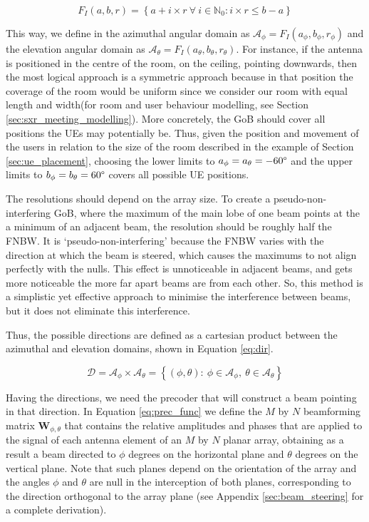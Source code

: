 \begin{equation} \label{eq:inter_func}
    F_I(a, b, r) = \left\{a + i \times r \  \forall \ i \in \mathbb{N}_0: i \times r \leq b-a \right\}
\end{equation}

This way, we define in the azimuthal angular domain as $\mathcal{A}_\phi = F_I(a_\phi, b_\phi, r_\phi)$ and the elevation angular domain as $\mathcal{A}_\theta = F_I(a_\theta, b_\theta, r_\theta)$. For instance, if the antenna is positioned in the centre of the room, on the ceiling, pointing downwards, then the most logical approach is a symmetric approach because in that position the coverage of the room would be uniform since we consider our room with equal length and width(for room and user behaviour modelling, see Section \ref{sec:sxr_meeting_modelling}). More concretely, the GoB should cover all positions the UEs may potentially be. Thus, given the position and movement of the users in relation to the size of the room described in the example of Section \ref{sec:ue_placement}, choosing the lower limits to $a_\phi = a_\theta = -60\text{\textdegree}$ and the upper limits to $b_\phi = b_\theta = 60\text{\textdegree}$ covers all possible UE positions.

The resolutions should depend on the array size. To create a pseudo-non-interfering GoB, where the maximum of the main lobe of one beam points at the a minimum of an adjacent beam, the resolution should be roughly half the \ac{FNBW}. It is `pseudo-non-interfering' because the \ac{FNBW} varies with the direction at which the beam is steered, which causes the maximums to not align perfectly with the nulls. This effect is unnoticeable in adjacent beams, and gets more noticeable the more far apart beams are from each other. So, this method is a simplistic yet effective approach to minimise the interference between beams, but it does not eliminate this interference. 

Thus, the possible directions are defined as a cartesian product between the azimuthal and elevation domains, shown in Equation \eqref{eq:dir}.

\begin{equation} \label{eq:dir}
    \mathcal{D} = \mathcal{A}_\phi \times \mathcal{A}_\theta = \left\{(\phi, \theta) : \ \phi \in \mathcal{A}_\phi , \ \theta \in \mathcal{A}_\theta\right\}
\end{equation}


Having the directions, we need the precoder that will construct a beam pointing in that direction. In Equation \eqref{eq:prec_func} we define the $M$ by $N$ beamforming matrix $\bm{W}_{\phi, \theta}$ that contains the relative amplitudes and phases that are applied to the signal of each antenna element of an $M$ by $N$ planar array, obtaining as a result a beam directed to $\phi$ degrees on the horizontal plane and $\theta$ degrees on the vertical plane. Note that such planes depend on the orientation of the array and the angles $\phi$ and $\theta$ are null in the interception of both planes, corresponding to the direction orthogonal to the array plane (see Appendix \ref{sec:beam_steering} for a complete derivation).


